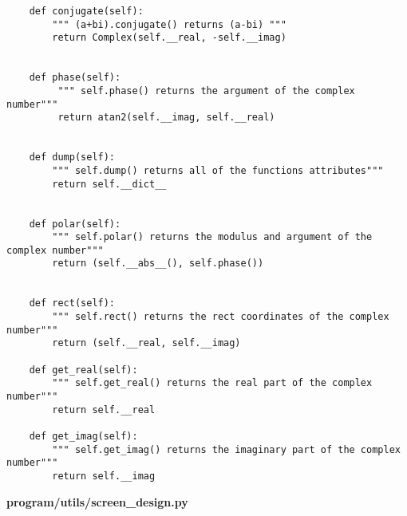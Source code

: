 \documentclass{article}
\begin{document}
\begin{lstlisting}
    def conjugate(self):
        """ (a+bi).conjugate() returns (a-bi) """
        return Complex(self.__real, -self.__imag)


    def phase(self):
         """ self.phase() returns the argument of the complex number"""
         return atan2(self.__imag, self.__real)


    def dump(self):
        """ self.dump() returns all of the functions attributes"""
        return self.__dict__


    def polar(self):
        """ self.polar() returns the modulus and argument of the complex number"""
        return (self.__abs__(), self.phase())


    def rect(self):
        """ self.rect() returns the rect coordinates of the complex number"""
        return (self.__real, self.__imag)

    def get_real(self):
        """ self.get_real() returns the real part of the complex number"""
        return self.__real

    def get_imag(self):
        """ self.get_imag() returns the imaginary part of the complex number"""
        return self.__imag
\end{lstlisting}


\textbf{program/utils/screen_design.py}
\end{document}
